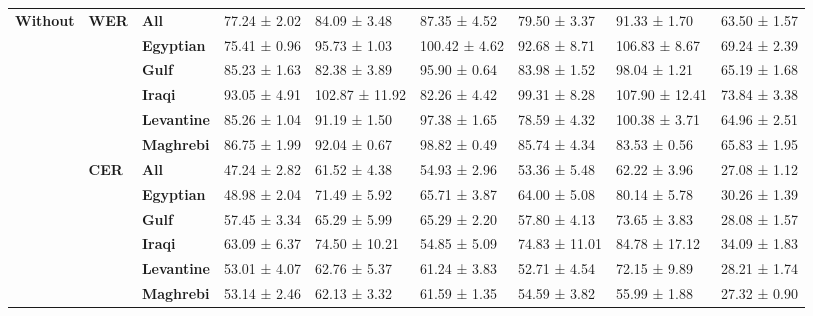 \begin{table}
\begin{tabular}{lllllllll}
\multirow[t]{12}{*}{\textbf{Without}} & \multirow[t]{6}{*}{\textbf{WER}} & \textbf{All} & 77.24 ± 2.02 & 84.09 ± 3.48 & 87.35 ± 4.52 & 79.50 ± 3.37 & 91.33 ± 1.70 & 63.50 ± 1.57 \\
\textbf{} & \textbf{} & \textbf{Egyptian} & 75.41 ± 0.96 & 95.73 ± 1.03 & 100.42 ± 4.62 & 92.68 ± 8.71 & 106.83 ± 8.67 & 69.24 ± 2.39 \\
\textbf{} & \textbf{} & \textbf{Gulf} & 85.23 ± 1.63 & 82.38 ± 3.89 & 95.90 ± 0.64 & 83.98 ± 1.52 & 98.04 ± 1.21 & 65.19 ± 1.68 \\
\textbf{} & \textbf{} & \textbf{Iraqi} & 93.05 ± 4.91 & 102.87 ± 11.92 & 82.26 ± 4.42 & 99.31 ± 8.28 & 107.90 ± 12.41 & 73.84 ± 3.38 \\
\textbf{} & \textbf{} & \textbf{Levantine} & 85.26 ± 1.04 & 91.19 ± 1.50 & 97.38 ± 1.65 & 78.59 ± 4.32 & 100.38 ± 3.71 & 64.96 ± 2.51 \\
\textbf{} & \textbf{} & \textbf{Maghrebi} & 86.75 ± 1.99 & 92.04 ± 0.67 & 98.82 ± 0.49 & 85.74 ± 4.34 & 83.53 ± 0.56 & 65.83 ± 1.95 \\
\cline{2-9}
\textbf{} & \multirow[t]{6}{*}{\textbf{CER}} & \textbf{All} & 47.24 ± 2.82 & 61.52 ± 4.38 & 54.93 ± 2.96 & 53.36 ± 5.48 & 62.22 ± 3.96 & 27.08 ± 1.12 \\
\textbf{} & \textbf{} & \textbf{Egyptian} & 48.98 ± 2.04 & 71.49 ± 5.92 & 65.71 ± 3.87 & 64.00 ± 5.08 & 80.14 ± 5.78 & 30.26 ± 1.39 \\
\textbf{} & \textbf{} & \textbf{Gulf} & 57.45 ± 3.34 & 65.29 ± 5.99 & 65.29 ± 2.20 & 57.80 ± 4.13 & 73.65 ± 3.83 & 28.08 ± 1.57 \\
\textbf{} & \textbf{} & \textbf{Iraqi} & 63.09 ± 6.37 & 74.50 ± 10.21 & 54.85 ± 5.09 & 74.83 ± 11.01 & 84.78 ± 17.12 & 34.09 ± 1.83 \\
\textbf{} & \textbf{} & \textbf{Levantine} & 53.01 ± 4.07 & 62.76 ± 5.37 & 61.24 ± 3.83 & 52.71 ± 4.54 & 72.15 ± 9.89 & 28.21 ± 1.74 \\
\textbf{} & \textbf{} & \textbf{Maghrebi} & 53.14 ± 2.46 & 62.13 ± 3.32 & 61.59 ± 1.35 & 54.59 ± 3.82 & 55.99 ± 1.88 & 27.32 ± 0.90 \\
\cline{1-9} \cline{2-9}
\bottomrule
\end{tabular}
\end{table}
